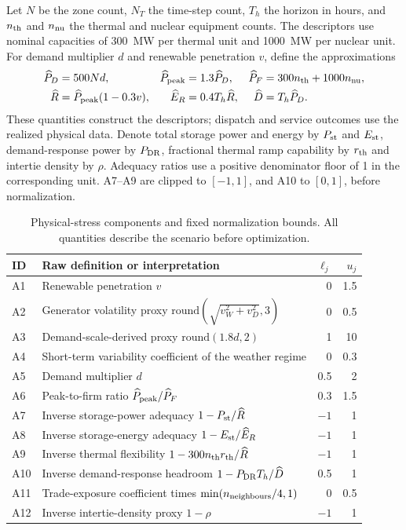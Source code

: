 Let $N$ be the zone count, $N_T$ the time-step count, $T_h$ the horizon in
hours, and $n_{\rm th}$ and $n_{\rm nu}$ the thermal and nuclear equipment
counts. The descriptors use nominal capacities of 300~MW per thermal unit
and 1000~MW per nuclear unit. For demand multiplier $d$ and renewable
penetration $v$, define the approximations
\begin{align}
 \widehat P_D&=500N d, & \widehat P_{\rm peak}&=1.3\widehat P_D, &
 \widehat P_F&=300n_{\rm th}+1000n_{\rm nu},\nonumber\\
 \widehat R&=\widehat P_{\rm peak}(1-0.3v), &
 \widehat E_R&=0.4T_h\widehat R, &
 \widehat D&=T_h\widehat P_D.
 \label{eq:descriptor_approximations}
\end{align}
These quantities construct the descriptors; dispatch and service outcomes
use the realized physical data. Denote total storage power and energy by
$P_{\rm st}$ and $E_{\rm st}$, demand-response power by $P_{\rm DR}$,
fractional thermal ramp capability by $r_{\rm th}$ and intertie density by
$\rho$. Adequacy ratios use a positive denominator floor of 1 in the
corresponding unit. A7--A9 are clipped to $[-1,1]$, and A10 to $[0,1]$,
before normalization.

\begin{table}[htbp]\centering\small
\begin{tabular}{lp{.59\linewidth}rr}\toprule
ID & Raw definition or interpretation & $\ell_j$ & $u_j$\\\midrule
A1 & Renewable penetration $v$ & 0 & 1.5\\
A2 & Generator volatility proxy $\mathrm{round}(\sqrt{v_W^2+v_D^2},3)$ & 0 & 0.5\\
A3 & Demand-scale-derived proxy $\mathrm{round}(1.8d,2)$ & 1 & 10\\
A4 & Short-term variability coefficient of the weather regime & 0 & 0.3\\
A5 & Demand multiplier $d$ & 0.5 & 2\\
A6 & Peak-to-firm ratio $\widehat P_{\rm peak}/\widehat P_F$ & 0.3 & 1.5\\
A7 & Inverse storage-power adequacy $1-P_{\rm st}/\widehat R$ & $-1$ & 1\\
A8 & Inverse storage-energy adequacy $1-E_{\rm st}/\widehat E_R$ & $-1$ & 1\\
A9 & Inverse thermal flexibility $1-300n_{\rm th}r_{\rm th}/\widehat R$ & $-1$ & 1\\
A10 & Inverse demand-response headroom $1-P_{\rm DR}T_h/\widehat D$ & 0.5 & 1\\
A11 & Trade-exposure coefficient times $\min(n_{\rm neighbours}/4,1)$ & 0 & 0.5\\
A12 & Inverse intertie-density proxy $1-\rho$ & $-1$ & 1\\\bottomrule
\end{tabular}
\caption{Physical-stress components and fixed normalization bounds.
All quantities describe the scenario before optimization.}
\label{tab:components}
\end{table}

